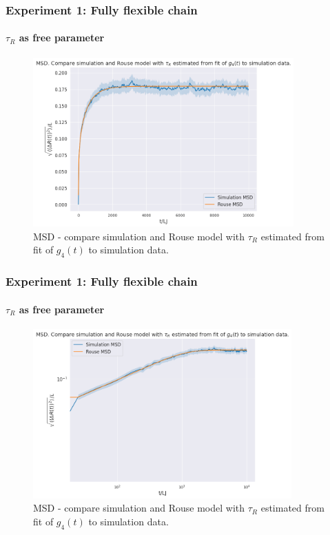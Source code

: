 \documentclass[handout]{beamer}
\begin{document}
\begin{frame}
    \frametitle{Experiment 1: Fully flexible chain}
    \framesubtitle{$\tau_R$ as free parameter}

    \begin{figure}[h]
        \includegraphics[trim={0.1cm 0.1cm 0.1cm 1cm},clip,height=6.5cm]{./3-exp-free-param.png}
        \caption{MSD - compare simulation and Rouse model 
        with $\tau_R$ estimated from fit of $g_4(t)$ to simulation data.}
        \label{fig:full-flex-chain-free}
    \end{figure}
\end{frame}

\begin{frame}
    \frametitle{Experiment 1: Fully flexible chain}
    \framesubtitle{$\tau_R$ as free parameter}

    \begin{figure}[h]
        \includegraphics[trim={0.1cm 0.1cm 0.1cm 1cm},clip,height=6.5cm]{./3-exp-free-param-log.png}
        \caption{MSD - compare simulation and Rouse model 
        with $\tau_R$ estimated from fit of $g_4(t)$ to simulation data.}
        \label{fig:full-flex-chain-free-log}
    \end{figure}
\end{frame}
\end{document}
